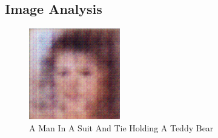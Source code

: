 \documentclass{article}%
\begin{document}
%
\subsection{Image Analysis}%
\label{subsec:ImageAnalysis}%


\begin{figure}[h!]%
\centering%
\includegraphics[width=150px]{500_fake_images/samples_5_417.png}%
\caption{A Man In A Suit And Tie Holding A Teddy Bear}%
\end{figure}

%
\end{document}
